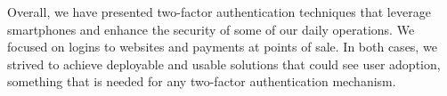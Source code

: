 Overall, we have presented two-factor authentication techniques that leverage smartphones and enhance the security of some of our daily operations. We focused on logins to websites and payments at points of sale. In both cases, we strived to achieve deployable and usable solutions that could see user adoption, something that is needed for any two-factor authentication mechanism.